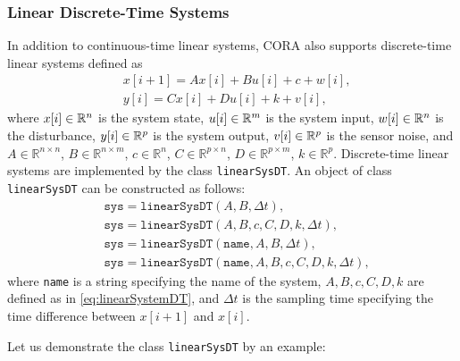 \subsubsection{Linear Discrete-Time Systems} \label{sec:linearSysDT}

In addition to continuous-time linear systems, CORA also supports discrete-time linear systems defined as
\begin{equation}\label{eq:linearSystemDT}
\begin{split}
	& x[i+1] = A x[i] + B u[i] + c  + w[i], \\
	& y[i] = C x[i] + D u[i] + k + v[i],
\end{split}
\end{equation} 
where $x[i] \in \mathbb{R}^n$ is the system state, $u[i] \in \mathbb{R}^m$ is the system input, $w[i] \in \mathbb{R}^n$ is the disturbance, $y[i] \in \mathbb{R}^p$ is the system output, $v[i] \in \mathbb{R}^p$ is the sensor noise, and $A \in \mathbb{R}^{n \times n}$, $B \in \mathbb{R}^{n \times m}$, $c \in \mathbb{R}^n$, $C \in \mathbb{R}^{p \times n}$, $D \in \mathbb{R}^{p \times m}$, $k \in \mathbb{R}^p$.
Discrete-time linear systems are implemented by the class \texttt{linearSysDT}. An object of class \texttt{linearSysDT} can be constructed as follows:
\begin{equation*}
	\begin{split}
		& \texttt{sys} = \texttt{linearSysDT}(A,B,\Delta t), \\
		& \texttt{sys} = \texttt{linearSysDT}(A,B,c,C,D,k,\Delta t), \\
		& \texttt{sys} = \texttt{linearSysDT}(\texttt{name},A,B,\Delta t), \\
		& \texttt{sys} = \texttt{linearSysDT}(\texttt{name},A,B,c,C,D,k,\Delta t),
	\end{split}
\end{equation*} 
where \texttt{name} is a string specifying the name of the system, $A,B,c,C,D,k$ are defined as in \eqref{eq:linearSystemDT}, and $\Delta t$ is the sampling time specifying the time difference between $x[i+1]$ and $x[i]$. 

Let us demonstrate the class \texttt{linearSysDT} by an example:

